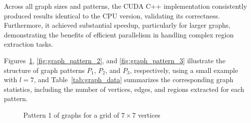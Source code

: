 \documentclass[conference]{IEEEtran}
\begin{document}
Across all graph sizes and patterns, the CUDA C++ implementation consistently produced results identical to the CPU version, validating its correctness. Furthermore, it achieved substantial speedup, particularly for larger graphs, demonstrating the benefits of efficient parallelism in handling complex region extraction tasks.

Figures~\ref{fig:graph_pattern_1}, \ref{fig:graph_pattern_2}, and \ref{fig:graph_pattern_3} illustrate the structure of graph patterns \(P_1\), \(P_2\), and \(P_3\), respectively, using a small example with \(l = 7\), and Table~\ref{tab:graph_data} summarizes the corresponding graph statistics, including the number of vertices, edges, and regions extracted for each pattern.

\begin{figure}[ht]
    \centering
    \caption{Pattern 1 of graphs for a grid of \(7 \times 7\) vertices}
    \label{fig:graph_pattern_1}
\end{figure}
\end{document}
